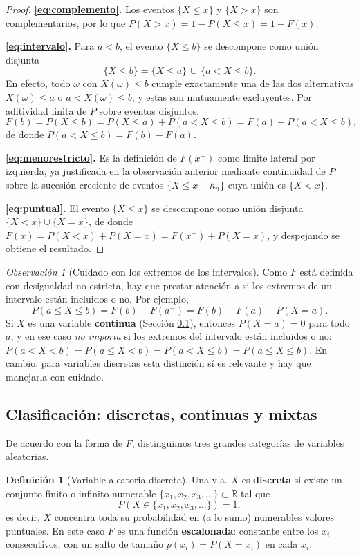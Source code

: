 \documentclass[11pt,a4paper]{article}
\theoremstyle{plain}
\theoremstyle{definition}
\newtheorem{definicion}[teorema]{Definición}
\theoremstyle{remark}
\newtheorem{observacion}[teorema]{Observación}
\begin{document}
\begin{proof}
\textbf{\eqref{eq:complemento}.} Los eventos $\{X\le x\}$ y $\{X>x\}$ son complementarios, por lo que $P(X>x)=1-P(X\le x)=1-F(x)$.

\textbf{\eqref{eq:intervalo}.} Para $a<b$, el evento $\{X\le b\}$ se descompone como unión disjunta
$$\{X\le b\}=\{X\le a\}\,\cup\,\{a<X\le b\}.$$
En efecto, todo $\omega$ con $X(\omega)\le b$ cumple exactamente una de las dos alternativas $X(\omega)\le a$ o $a<X(\omega)\le b$, y estas son mutuamente excluyentes. Por aditividad finita de $P$ sobre eventos disjuntos,
$$F(b)=P(X\le b)=P(X\le a)+P(a<X\le b)=F(a)+P(a<X\le b),$$
de donde $P(a<X\le b)=F(b)-F(a)$.

\textbf{\eqref{eq:menorestricto}.} Es la definición de $F(x^-)$ como límite lateral por izquierda, ya justificada en la observación anterior mediante continuidad de $P$ sobre la sucesión creciente de eventos $\{X\le x-h_n\}$ cuya unión es $\{X<x\}$.

\textbf{\eqref{eq:puntual}.} El evento $\{X\le x\}$ se descompone como unión disjunta $\{X<x\}\cup\{X=x\}$, de donde $F(x)=P(X<x)+P(X=x)=F(x^-)+P(X=x)$, y despejando se obtiene el resultado.
\end{proof}

\begin{observacion}[Cuidado con los extremos de los intervalos]
Como $F$ está definida con desigualdad no estricta, hay que prestar atención a si los extremos de un intervalo están incluidos o no. Por ejemplo,
$$P(a\le X\le b)=F(b)-F(a^-)=F(b)-F(a)+P(X=a).$$
Si $X$ es una variable \textbf{continua} (Sección \ref{sec:continuas}), entonces $P(X=a)=0$ para todo $a$, y en ese caso \emph{no importa} si los extremos del intervalo están incluidos o no: $P(a<X<b)=P(a\le X<b)=P(a<X\le b)=P(a\le X\le b)$. En cambio, para variables discretas esta distinción sí es relevante y hay que manejarla con cuidado.
\end{observacion}

\subsection{Clasificación: discretas, continuas y mixtas}\label{sec:continuas}

De acuerdo con la forma de $F$, distinguimos tres grandes categorías de variables aleatorias.

\begin{definicion}[Variable aleatoria discreta]
Una v.a. $X$ es \textbf{discreta} si existe un conjunto finito o infinito numerable $\{x_1,x_2,x_3,\dots\}\subset\mathbb{R}$ tal que
$$P(X\in\{x_1,x_2,x_3,\dots\})=1,$$
es decir, $X$ concentra toda su probabilidad en (a lo sumo) numerables valores puntuales. En este caso $F$ es una función \textbf{escalonada}: constante entre los $x_i$ consecutivos, con un salto de tamaño $p(x_i)=P(X=x_i)$ en cada $x_i$.
\end{definicion}
\end{document}
